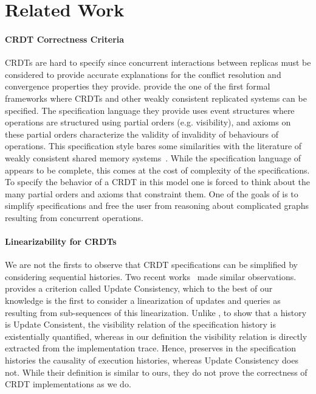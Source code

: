 \section{Related Work}
\label{sec:rel-work}

\paragraph{CRDT Correctness Criteria}
CRDTs are hard to specify since concurrent interactions between
replicas must be considered to provide accurate explanations for the
conflict resolution and convergence properties they provide.
%
\citet{BurckhardtGYZ14, Burckhardt14} provide the one of the first formal
frameworks where CRDTs and other weakly consistent replicated systems
can be specified.
%
The specification language they provide uses event structures where
operations are structured using partial orders (e.g. visibility), and
axioms on these partial orders characterize the validity of invalidity
of behaviours of operations.
%
This specification style bares some similarities with the literature
of weakly consistent shared memory systems~\cite{AlglaveMT14}.
%
While the specification language
of~\cite{BurckhardtGYZ14,Burckhardt14} appears to be complete, this
comes at the cost of complexity of the specifications.
%
To specify the behavior of a CRDT in this model one is forced to think
about the many partial orders and axioms that constraint them.
%
One of the goals of \CRDTLinshort{} is to simplify specifications and
free the user from reasoning about complicated graphs resulting from
concurrent operations.

\paragraph{Linearizability for CRDTs}
We are not the firsts to observe that CRDT specifications can be
simplified by considering sequential histories.
%
Two recent works~\cite{PerrinMJ14, JagadeesanR18} made similar
observations.
%
\citet{PerrinMJ14} provides a criterion called Update Consistency,
which to the best of our knowledge is the first to consider a
linearization of updates and queries as resulting from sub-sequences
of this linearization.
%
Unlike \CRDTLinshort{}, to show that a history is Update Consistent,
the visibility relation of the specification history is existentially
quantified, whereas in our definition the visibility relation is
directly extracted from the implementation trace.
%
Hence, \CRDTLinshort{} preserves in the specification histories the
causality of execution histories, whereas Update Consistency does not.
%
While their definition is similar to ours, they do not prove the
correctness of CRDT implementations as we do.

